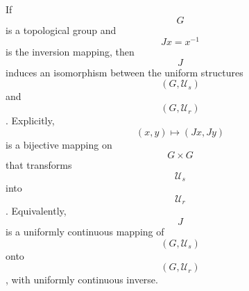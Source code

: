 If $$G$$ is a topological group and $$Jx = x^{-1}$$ is the inversion mapping, then $$J$$ induces an isomorphism between the uniform structures $$(G, \mathcal{U}_s)$$ and $$(G, \mathcal{U}_r)$$. Explicitly, $$(x, y) \mapsto (Jx, Jy)$$ is a bijective mapping on $$G \times G$$ that transforms $$\mathcal{U}_s$$ into $$\mathcal{U}_r$$. Equivalently, $$J$$ is a uniformly continuous mapping of $$(G, \mathcal{U}_s)$$ onto $$(G, \mathcal{U}_r)$$, with uniformly continuous inverse.
